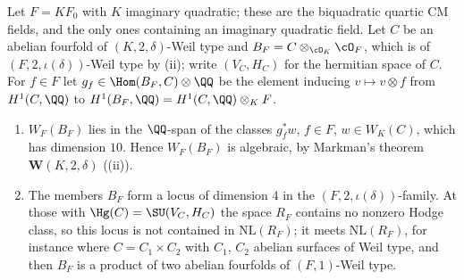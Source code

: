 \begin{proposition}
\label{prop:quarticscalar}
Let $F=KF_{0}$ with $K$ imaginary quadratic; these are the biquadratic
quartic CM fields, and the only ones containing an imaginary quadratic field.
Let $C$ be an abelian fourfold of $(K,2,\delta)$-Weil type and
$B_{F}=C\otimes_{\cO_{K}}\cO_{F}$, which is of $(F,2,\iota(\delta))$-Weil type by
(ii); write $(V_{C},H_{C})$ for the hermitian space of $C$.
For $f\in F$ let $g_{f}\in\Hom(B_{F},C)\otimes\QQ$ be the element inducing
$v\mapsto v\otimes f$ from $H^{1}(C,\QQ)$ to
$H^{1}(B_{F},\QQ)=H^{1}(C,\QQ)\otimes_{K}F$.
\begin{enumerate}[label=\textup{(\roman*)},leftmargin=2.6em,itemsep=2pt]
\item $W_{F}(B_{F})$ lies in the $\QQ$-span of the classes $g_{f}^{*}w$, $f\in F$,
  $w\in W_{K}(C)$, which has dimension $10$. Hence $W_{F}(B_{F})$ is
  algebraic, by Markman's theorem $\mathbf{W}(K,2,\delta)$ \cite{Mar25a}
  ((ii)).
\item The members $B_{F}$ form a locus of dimension $4$ in the
  $(F,2,\iota(\delta))$-family. At those with $\Hg(C)=\SU(V_{C},H_{C})$ the
  space $R_{F}$ contains no nonzero Hodge class, so
  this locus is not contained in $\mathrm{NL}(R_{F})$; it meets
  $\mathrm{NL}(R_{F})$, for instance where $C=C_{1}\times C_{2}$ with $C_{1}$,
  $C_{2}$ abelian surfaces of Weil type, and then $B_{F}$ is a product of two
  abelian fourfolds of $(F,1)$-Weil type.
\end{enumerate}
\end{proposition}

